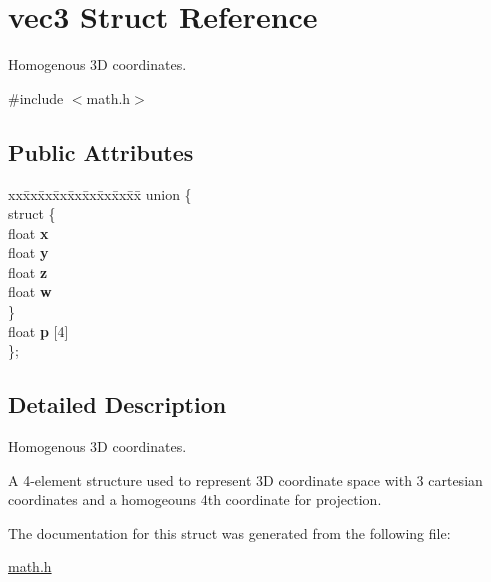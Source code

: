 \hypertarget{structvec3}{}\section{vec3 Struct Reference}
\label{structvec3}


Homogenous 3D coordinates.  




{\ttfamily \#include $<$math.\+h$>$}

\subsection*{Public Attributes}
\begin{DoxyCompactItemize}
\item 
\mbox{\label{structvec3_ae5a1cf26166774918ebecc3a1c5cac4b}} 
\begin{tabbing}
xx\=xx\=xx\=xx\=xx\=xx\=xx\=xx\=xx\=\kill
union \{\\
\mbox{\label{unionvec3_1_1_0D4_a528169d018e689644b47b2222d1c9771}} 
\>struct \{\\
\>\>float {\bfseries x}\\
\>\>float {\bfseries y}\\
\>\>float {\bfseries z}\\
\>\>float {\bfseries w}\\
\>\} \\
\>float {\bfseries p} \mbox{[}4\mbox{]}\\
\}; \\

\end{tabbing}\end{DoxyCompactItemize}


\subsection{Detailed Description}
Homogenous 3D coordinates. 

A 4-\/element structure used to represent 3D coordinate space with 3 cartesian coordinates and a homogeouns 4th coordinate for projection. 

The documentation for this struct was generated from the following file\+:\begin{DoxyCompactItemize}
\item 
\hyperlink{math_8h}{math.\+h}\end{DoxyCompactItemize}

